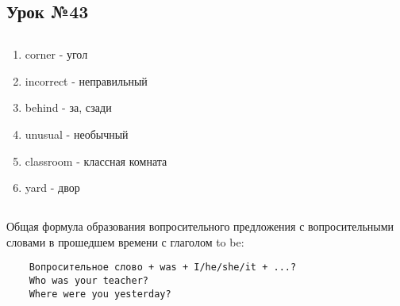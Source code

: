\subsection{Урок №43}

\subsection*{}
\begin{multicols}{2}
    \begin{enumerate}\setlength{\itemsep}{0pt}
        \item corner - угол
        \item incorrect - неправильный
        \item behind - за, сзади
        \item unusual - необычный
        \item classroom - классная комната
        \item yard - двор
    \end{enumerate}
\end{multicols}

\subsection*{}
Общая формула образования вопросительного предложения с вопросительными словами в прошедшем времени с глаголом
to be:
\begin{verbatim}
    Вопросительное слово + was + I/he/she/it + ...?
    Who was your teacher?
    Where were you yesterday?
\end{verbatim}